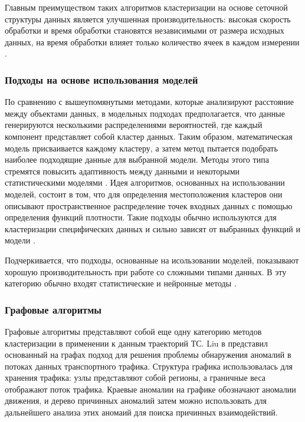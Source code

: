 Главным преимуществом таких алгоритмов кластеризации на основе сеточной структуры данных является улучшенная производительность: высокая скорость обработки и время обработки становятся независимыми от размера исходных данных, на время обработки влияет только количество ячеек в каждом измерении \cite{article:8_review_mot_cl_alg}.

\subsubsection{Подходы на основе использования моделей}

По сравнению с вышеупомянутыми методами, которые анализируют расстояние между объектами данных, в модельных подходах предполагается, что данные генерируются несколькими распределениями вероятностей, где каждый компонент представляет собой кластер данных. Таким образом, математическая модель присваивается каждому кластеру, а затем метод пытается подобрать наиболее подходящие данные для выбранной модели. Методы этого типа стремятся повысить адаптивность между данными и некоторыми статистическими моделями \cite{article:8_review_mot_cl_alg}\cite{article:22_survey_dscc}. Идея алгоритмов, основанных на использовании моделей, состоит в том, что для определения местоположения кластеров они описывают пространственное распределение точек входных данных с помощью определения функций плотности. Такие подходы обычно используются для кластеризации специфических данных и сильно зависят от выбранных функций и модели \cite{article:5_survey_tbsa}.

Подчеркивается, что подходы, основанные на исользовании моделей, показывают хорошую производительность при работе со сложными типами данных. В эту категорию обычно входят статистические и нейронные методы \cite{article:8_review_mot_cl_alg}.

\subsubsection{Графовые алгоритмы \cite{article:1_survey_stdm}}

Графовые алгоритмы представляют собой еще одну категорию методов кластеризации в применении к данным траекторий ТС. Liu в \cite{inproceedings:26_dstci_tds} представил основанный на графах подход для решения проблемы обнаружения аномалий в потоках данных транспортного трафика. Структура графика использовалась для хранения трафика: узлы представляют собой регионы, а граничные веса отображают поток трафика. Краевые аномалии на графике обозначают аномалии движения, и дерево причинных аномалий затем можно использовать для дальнейшего анализа этих аномаий для поиска причинных взаимодействий.


